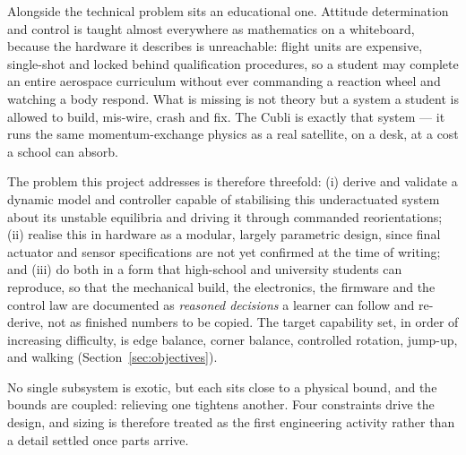 Alongside the technical problem sits an educational one. Attitude determination and control is taught almost everywhere as mathematics on a whiteboard, because the hardware it describes is unreachable: flight units are expensive, single-shot and locked behind qualification procedures, so a student may complete an entire aerospace curriculum without ever commanding a reaction wheel and watching a body respond. What is missing is not theory but a system a student is allowed to build, mis-wire, crash and fix. The Cubli is exactly that system --- it runs the same momentum-exchange physics as a real satellite, on a desk, at a cost a school can absorb.

The problem this project addresses is therefore threefold: (i) derive and validate a dynamic model and controller capable of stabilising this underactuated system about its unstable equilibria and driving it through commanded reorientations; (ii) realise this in hardware as a modular, largely parametric design, since final actuator and sensor specifications are not yet confirmed at the time of writing; and (iii) do both in a form that high-school and university students can reproduce, so that the mechanical build, the electronics, the firmware and the control law are documented as \emph{reasoned decisions} a learner can follow and re-derive, not as finished numbers to be copied. The target capability set, in order of increasing difficulty, is edge balance, corner balance, controlled rotation, jump-up, and walking (Section~\ref{sec:objectives}).

No single subsystem is exotic, but each sits close to a physical bound, and the bounds are coupled: relieving one tightens another. Four constraints drive the design, and sizing is therefore treated as the first engineering activity rather than a detail settled once parts arrive.

